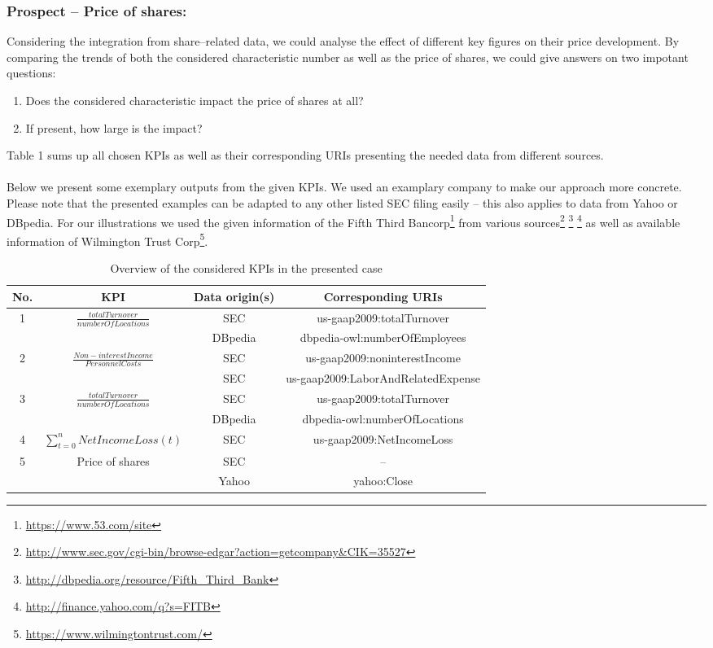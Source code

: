 \documentclass[runningheads]{llncs}
\begin{document}
\subsubsection{Prospect -- Price of shares:}
Considering the integration from share--related data, we could analyse the effect of different key figures on their price development. By comparing the trends of both the considered characteristic number as well as the price of shares, we could give answers on two impotant questions:
\begin{enumerate}
\item Does the considered characteristic impact the price of shares at all?
\item If present, how large is the impact?
\end{enumerate}
Table 1 sums up all chosen KPIs as well as their corresponding URIs presenting the needed data from different sources. \\ \\
Below we present some exemplary outputs from the given KPIs. We used an examplary company to make our approach more concrete. Please note that the presented examples can be adapted to any other listed SEC filing easily -- this also applies to data from Yahoo or DBpedia. For our illustrations we used the given information of the Fifth Third Bancorp\footnote{\url{https://www.53.com/site}} from various sources\footnote{\url{http://www.sec.gov/cgi-bin/browse-edgar?action=getcompany&CIK=35527}} \footnote{\url{http://dbpedia.org/resource/Fifth_Third_Bank}} \footnote{\url{http://finance.yahoo.com/q?s=FITB}} as well as available information of Wilmington Trust Corp\footnote{\url{https://www.wilmingtontrust.com/}}.
\begin{table}[!h]
\begin{tabular}{|c|c|c|c|}
\hline
\textbf{No.} & \textbf{KPI} & \textbf{Data origin(s)} & \textbf{Corresponding URIs} \\
\hline
\hline
\multirow{2}{*}{1} & \multirow{2}{*}{ $\frac{totalTurnover}{numberOfLocations}$} & SEC & us-gaap2009:totalTurnover\\
 & & DBpedia & dbpedia-owl:numberOfEmployees\\
\hline
\multirow{2}{*}{2} & \multirow{2}{*}{ $\frac{Non-interestIncome}{PersonnelCosts}$ } & SEC & us-gaap2009:noninterestIncome\\
 & & SEC & us-gaap2009:LaborAndRelatedExpense\\
\hline
\multirow{2}{*}{3} & \multirow{2}{*}{ $\frac{totalTurnover}{numberOfLocations}$} & SEC & us-gaap2009:totalTurnover\\
 & & DBpedia & dbpedia-owl:numberOfLocations\\
\hline
4 & $\sum_{t=0}^{n}NetIncomeLoss(t)$ & SEC & us-gaap2009:NetIncomeLoss \\ 
\hline
\multirow{2}{*}{5} & \multirow{2}{*}{Price of shares} & SEC & -- \\
 & & Yahoo &yahoo:Close\\
\hline
\end{tabular}
\label{table1}
\caption{Overview of the considered KPIs in the presented case}
\end{table}
\end{document}
